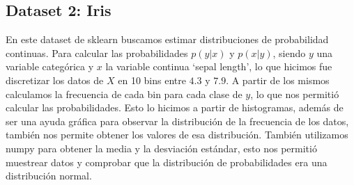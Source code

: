 \documentclass[11pt]{article}
\begin{document}
\subsection{Dataset 2: Iris}
En este dataset de sklearn buscamos estimar distribuciones de probabilidad continuas. Para calcular las probabilidades $p(y|x)$ y $p(x|y)$, siendo $y$ una variable categórica y $x$ la variable continua `sepal length’, lo que hicimos fue discretizar los datos de $X$ en 10 bins entre $4.3$ y $7.9$. A partir de los mismos calculamos la frecuencia de cada bin para cada clase de $y$, lo que nos permitió calcular las probabilidades. Esto lo hicimos a partir de histogramas, además de ser una ayuda gráfica para observar la distribución de la frecuencia de los datos, también nos permite obtener los valores de esa distribución. También utilizamos numpy para obtener la media y la desviación estándar, esto nos permitió muestrear datos y comprobar que la distribución de probabilidades era una distribución normal.  
\end{document}
